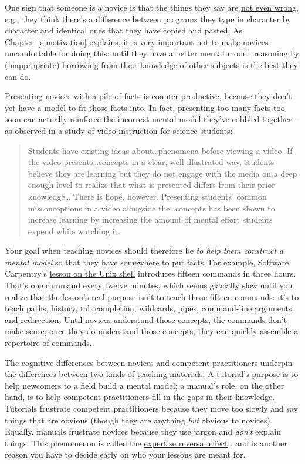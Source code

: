 One sign that someone is a novice is that the things they say are \href{https://en.wikipedia.org/wiki/Not_even_wrong}{not
even wrong}, e.g., they think there's a difference
between programs they type in character by character and identical
ones that they have copied and pasted. As Chapter~\ref{s:motivation}
explains, it is very important not to make novices uncomfortable for
doing this: until they have a better mental model, reasoning by
(inappropriate) borrowing from their knowledge of other subjects is
the best they can do.

Presenting novices with a pile of facts is counter-productive, because
they don't yet have a model to fit those facts into. In fact, presenting
too many facts too soon can actually reinforce the incorrect mental
model they've cobbled together---as \cite{Mull2007a} observed in a
study of video instruction for science students:

\begin{quote}\setlength{\parindent}{0pt}
Students have existing ideas about\ldots{}phenomena before
viewing a video. If the video presents\ldots{}concepts in a
clear, well illustrated way, students believe they are learning but
they do not engage with the media on a deep enough level to realize
that what is presented differs from their prior
knowledge\ldots{} There is hope, however. Presenting students'
common misconceptions in a video alongside the\ldots{}concepts
has been shown to increase learning by increasing the amount of mental
effort students expend while watching it.
\end{quote}

Your goal when teaching novices should therefore be \emph{to help them
construct a mental model} so that they have somewhere to put
facts. For example, Software Carpentry's \href{http://swcarpentry.github.io/shell-novice/}{lesson on the Unix
shell} introduces fifteen commands in three
hours. That's one command every twelve minutes, which seems glacially
slow until you realize that the lesson's real purpose isn't to teach
those fifteen commands: it's to teach paths, history, tab completion,
wildcards, pipes, command-line arguments, and redirection. Until
novices understand those concepts, the commands don't make sense; once
they do understand those concepts, they can quickly assemble a
repertoire of commands.

The cognitive differences between novices and competent practitioners
underpin the differences between two kinds of teaching materials. A
tutorial's purpose is to help newcomers to a field build a mental
model; a manual's role, on the other hand, is to help competent
practitioners fill in the gaps in their knowledge. Tutorials frustrate
competent practitioners because they move too slowly and say things
that are obvious (though they are anything \emph{but} obvious to
novices). Equally, manuals frustrate novices because they use jargon
and \emph{don't} explain things. This phenomenon is called the \protect\hyperlink{g:expertise-reversal}{expertise
reversal effect} \cite{Kaly2003}, and is
another reason you have to decide early on who your lessons are meant
for.

